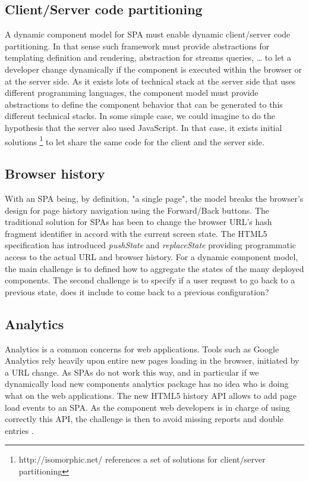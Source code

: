 \subsection{Client/Server code partitioning}
A dynamic component model for SPA must enable dynamic client/server code partitioning. In that sense such framework must provide abstractions for templating definition and rendering, abstraction for streams queries, … to let a developer change dynamically if the component is executed within the browser or at the server side. As it exists lots of technical stack at the server side that uses different programming languages, the component model must provide abstractions to define the component behavior that can be generated to this different technical stacks. In some simple case, we could imagine to do the hypothesis that the server also used JavaScript. In that case, it exists initial solutions \footnote{http://isomorphic.net/ references a set of solutions for client/server partitioning} to let share the same code for the client and the server side.

\subsection{Browser history}
With an SPA being, by definition, "a single page", the model breaks the browser's design for page history navigation using the Forward/Back buttons. The traditional solution for SPAs has been to change the browser URL's hash fragment identifier in accord with the current screen state.
The HTML5 specification has introduced \textit{pushState} and \textit{replaceState} providing programmatic access to the actual URL and browser history.
For a dynamic component model, the main challenge is to defined how to aggregate the states of the many deployed components.
The second challenge is to specify if a user request to go back to a previous state, does it include to come back to a previous configuration?


\subsection{Analytics}

Analytics is a common concerns for web applications.
Tools such as Google Analytics rely heavily upon entire new pages loading in the browser, initiated by a URL change. As SPAs do not work this way, and in particular if we dynamically load new components analytics package has no idea who is doing what on the web applications.
The new HTML5 history API allows to add page load events to an SPA.
As the component web developers is in charge of using correctly this API, the challenge is then to avoid missing reports and double entries   .


